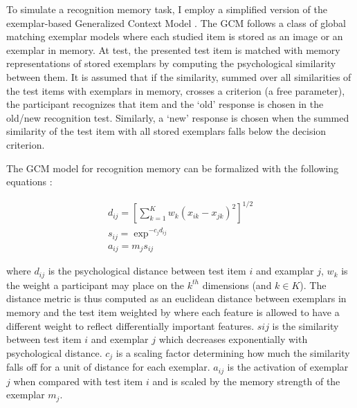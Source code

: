 To simulate a recognition memory task, I employ a simplified version of the exemplar-based Generalized Context Model \cite{nosofsky2011generalized,nosofsky1986attention, nosofsky2011short}. The GCM follows a class of global matching exemplar models where each studied item is stored as an image or an exemplar in memory. At test, the presented test item is matched with memory representations of stored exemplars by computing the psychological similarity between them. It is assumed that if the similarity, summed over all similarities of the test items with exemplars in memory, crosses a criterion (a free parameter), the participant recognizes that item and the `old' response is chosen in the old/new recognition test. Similarly, a `new' response is chosen when the summed similarity of the test item with all stored exemplars falls below the decision criterion. 

The GCM model for recognition memory can be formalized with the following equations \cite{nosofsky2011short}:

\begin{equation}
    \begin{aligned}
        d_{ij} = [\sum\limits_{k = 1}^K w_k(x_{ik} - x_{jk})^2]^{1/2} \\
        s_{ij} = \exp^{-c_jd_{ij}} \\
        a_{ij} = m_js_{ij}
    \end{aligned}
\end{equation}    

where $d_{ij}$ is the psychological distance between test item $i$ and examplar $j$, $w_k$ is the weight a participant may place on the $k^{th}$ dimensions (and $k \in K$). The distance metric is thus computed as an euclidean distance between exemplars in memory and the test item weighted by where each feature is allowed to have a different weight to reflect differentially important features. $s{ij}$ is the similarity between test item $i$ and exemplar $j$ which decreases exponentially with psychological distance. $c_j$ is a scaling factor determining how much the similarity falls off for a unit of distance for each exemplar. $a_{ij}$ is the activation of exemplar $j$ when compared with test item $i$ and is scaled by the memory strength of the exemplar $m_j$. 

